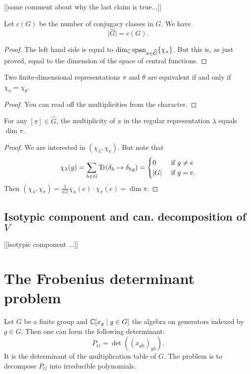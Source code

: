 \documentclass[11pt, english]{article}
\begin{document}
[[some comment about why the last claim is true...]]

\begin{corr}
Let $c(G)$ be the number of conjugacy classes in $G$. We have
$$
\lvert \widehat G \rvert = c(G).
$$
\end{corr}
\begin{proof}
 The left hand side is equal to $\dim_{\mathbb{C}} \text{span}_{\pi \in \widehat G} \{ \chi_\pi \}$. But this is, as just proved, equal to the dimension of the space of central functions.
\end{proof}

\begin{corr}
 Two finite-dimensional representations $\pi$ and $\theta$ are equivalent if and only if $\chi_\pi = \chi_\theta$.
\end{corr}
\begin{proof}
  You can read off the multiplicities from the character.
\end{proof}

\begin{corr}
 For any $[\pi] \in \widehat G$, the multiplicity of $\pi$ in the regular representation $\lambda$ equals $\dim \pi$.
\end{corr}
\begin{proof}
 We are interested in $(\chi_\lambda, \chi_\pi)$. But note that
$$
\chi_\lambda(g) = \sum_{h \in G} \operatorname{Tr} ( \delta_h \mapsto \delta_{hg} ) = \begin{cases} 0 & \text{ if } g \neq e \\
\lvert G \rvert & \text{ if } g = e.
\end{cases}
$$
Then $(\chi_\lambda,\chi_\pi) = \frac{1}{\lvert G \rvert} \chi_\lambda(e) \cdot \overline{\chi_\pi(e)} = \dim \pi$.
\end{proof}

\subsection{Isotypic component and can. decomposition of $V$}

[[isotypic component ...]]


\section{The Frobenius determinant problem}

Let $G$ be a finite group and $\mathbb{C}[x_g \mid g \in G]$ the algebra on generators indexed by $g \in G$. Then one can form the following determinant:
$$
P_G  = \det \left( (x_{gh})_{gh} \right).
$$
It is the determinant of the multiplication table of $G$. The problem is to decompose $P_G$ into irreducible polynomials.
\end{document}
